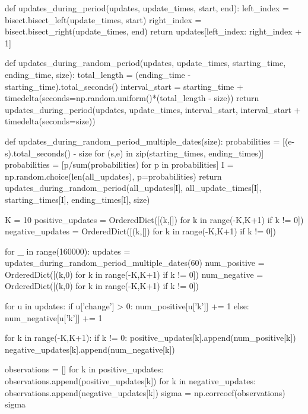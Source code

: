 def updates_during_period(updates, update_times, start, end):
    left_index = bisect.bisect_left(update_times, start)
    right_index = bisect.bisect_right(update_times, end)
    return updates[left_index: right_index + 1]
    
def updates_during_random_period(updates, update_times, starting_time, ending_time, size):
    total_length = (ending_time - starting_time).total_seconds()
    interval_start = starting_time + timedelta(seconds=np.random.uniform()*(total_length - size))
    return updates_during_period(updates, update_times, interval_start, interval_start + timedelta(seconds=size))

def updates_during_random_period_multiple_dates(size):
    probabilities = [(e-s).total_seconds() - size for (s,e) in zip(starting_times, ending_times)]
    probabilities = [p/sum(probabilities) for p in probabilities]
    I = np.random.choice(len(all_updates), p=probabilities)
    return updates_during_random_period(all_updates[I], all_update_times[I], starting_times[I], ending_times[I], size)
    
K = 10
positive_updates = OrderedDict([(k,[]) for k in range(-K,K+1) if k != 0])
negative_updates = OrderedDict([(k,[]) for k in range(-K,K+1) if k != 0])

for _ in range(160000):
    updates = updates_during_random_period_multiple_dates(60)
    num_positive = OrderedDict([(k,0) for k in range(-K,K+1) if k != 0])
    num_negative = OrderedDict([(k,0) for k in range(-K,K+1) if k != 0])
    
    for u in updates:
        if u['change'] > 0:
            num_positive[u['k']] += 1
        else:
            num_negative[u['k']] += 1
            
    for k in range(-K,K+1):
        if k != 0:
            positive_updates[k].append(num_positive[k])
            negative_updates[k].append(num_negative[k])
            
observations = []
for k in positive_updates:
    observations.append(positive_updates[k])
for k in negative_updates:
    observations.append(negative_updates[k])
sigma = np.corrcoef(observations)
sigma